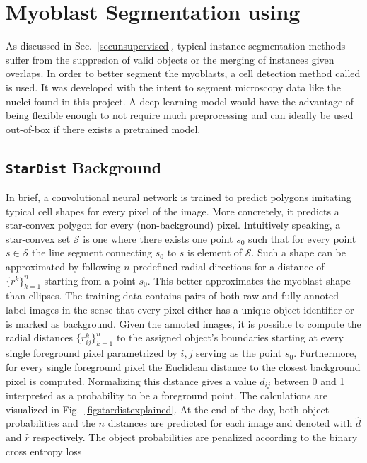 \section{Myoblast Segmentation using \stardist}
As discussed in Sec.~\ref{secunsupervised}, typical instance segmentation methods suffer from the suppresion of valid objects or the merging of instances given overlaps. In order to better segment the myoblasts, a cell detection method called \stardist \cite{schmidt2018, weigert2020} is used. It was developed with the intent to segment microscopy data like the nuclei found in this project. A deep learning model would have the advantage of being flexible enough to not require much preprocessing and can ideally be used out-of-box if there exists a pretrained model.
\subsection{\texttt{StarDist} Background}
In brief, a convolutional neural network is trained to predict polygons imitating typical cell shapes for every pixel of the image. More concretely, it predicts a star-convex polygon for every (non-background) pixel. Intuitively speaking, a star-convex set $\mathcal{S}$ is one where there exists one point $s_{0}$ such that for every point $s \in \mathcal{S}$ the line segment connecting $s_{0}$ to $s$ is element of $\mathcal{S}$. Such a shape can be approximated by following $n$ predefined radial directions for a distance of $\{r^{k}\}^{n}_{k = 1}$ starting from a point $s_{0}$. This better approximates the myoblast shape than ellipses. The training data contains pairs of both raw and fully annoted label images in the sense that every pixel either has a unique object identifier or is marked as background. Given the annoted images, it is possible to compute the radial distances $\{r^{k}_{ij}\}^{n}_{k = 1}$ to the assigned object's boundaries starting at every single foreground pixel parametrized by $i, j$ serving as the point  $s_{0}$. Furthermore, for every single foreground pixel the Euclidean distance to the closest background pixel is computed. Normalizing this distance gives a value $d_{ij}$ between 0 and 1 interpreted as a probability to be a foreground point. The calculations are visualized in Fig.~\ref{figstardistexplained}. At the end of the day, both object probabilities and the $n$ distances are predicted for each image and denoted with $\hat{d}$ and $\hat{r}$ respectively. The object probabilities are penalized according to the binary cross entropy loss

